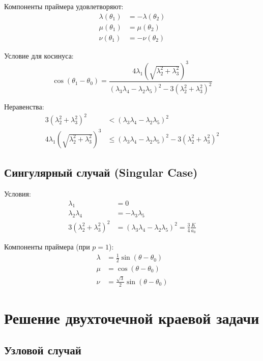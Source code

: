 \documentclass[12pt]{article}
\begin{document}
Компоненты праймера удовлетворяют:
\begin{align}
\lambda(\theta_1) &= -\lambda(\theta_2) \\
\mu(\theta_1) &= \mu(\theta_2) \\
\nu(\theta_1) &= -\nu(\theta_2) \tag{20}
\end{align}

Условие для косинуса:
\begin{equation}
\cos(\theta_1 - \theta_0) = \frac{4\lambda_1 (\sqrt{\lambda_2^2 + \lambda_3^2})^3}{(\lambda_3 \lambda_4 - \lambda_2 \lambda_5)^2 - 3(\lambda_2^2 + \lambda_3^2)^2} \tag{21}
\end{equation}

Неравенства:
\begin{align}
3(\lambda_2^2 + \lambda_3^2)^2 &< (\lambda_3 \lambda_4 - \lambda_2 \lambda_5)^2 \tag{22} \\
4\lambda_1 (\sqrt{\lambda_2^2 + \lambda_3^2})^3 &\leq (\lambda_3 \lambda_4 - \lambda_2 \lambda_5)^2 - 3(\lambda_2^2 + \lambda_3^2)^2 \tag{23}
\end{align}

\subsection{Сингулярный случай (Singular Case)}

Условия:
\begin{align}
\lambda_1 &= 0 \tag{24} \\
\lambda_2 \lambda_4 &= -\lambda_3 \lambda_5 \tag{25} \\
3(\lambda_2^2 + \lambda_3^2)^2 &= (\lambda_3 \lambda_4 - \lambda_2 \lambda_5)^2 = \frac{3}{4} \frac{K}{a_0} \tag{26}
\end{align}

Компоненты праймера (при $p = 1$):
\begin{align}
\lambda &= \frac{1}{2} \sin(\theta - \theta_0) \tag{27} \\
\mu &= \cos(\theta - \theta_0) \tag{28} \\
\nu &= \frac{\sqrt{3}}{2} \sin(\theta - \theta_0) \tag{29}
\end{align}

\section{Решение двухточечной краевой задачи}

\subsection{Узловой случай}
\end{document}
